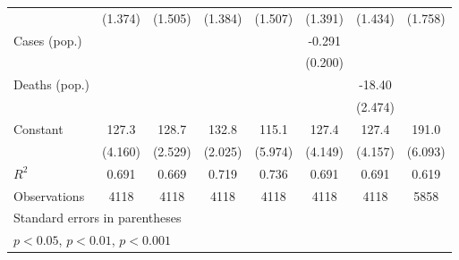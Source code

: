 \documentclass{article}
\begin{document}
{\begin{longtable}{l*{7}{c}}
                &  (1.374)         &  (1.505)         &  (1.384)         &  (1.507)         &  (1.391)         &  (1.434)         &  (1.758)         \\
Cases (pop.)    &                  &                  &                  &                  &   -0.291         &                  &                  \\
                &                  &                  &                  &                  &  (0.200)         &                  &                  \\
Deaths (pop.)   &                  &                  &                  &                  &                  &   -18.40\sym{***}&                  \\
                &                  &                  &                  &                  &                  &  (2.474)         &                  \\
Constant        &    127.3\sym{***}&    128.7\sym{***}&    132.8\sym{***}&    115.1\sym{***}&    127.4\sym{***}&    127.4\sym{***}&    191.0\sym{***}\\
                &  (4.160)         &  (2.529)         &  (2.025)         &  (5.974)         &  (4.149)         &  (4.157)         &  (6.093)         \\
\hline
\(R^{2}\)       &    0.691         &    0.669         &    0.719         &    0.736         &    0.691         &    0.691         &    0.619         \\
Observations    &     4118         &     4118         &     4118         &     4118         &     4118         &     4118         &     5858         \\
\hline\hline
\multicolumn{8}{l}{\footnotesize Standard errors in parentheses}\\
\multicolumn{8}{l}{\footnotesize \sym{*} \(p<0.05\), \sym{**} \(p<0.01\), \sym{***} \(p<0.001\)}\\
\end{longtable}
}
\end{document}
